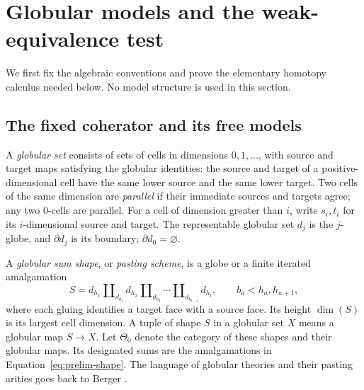 \documentclass[11pt,letterpaper]{article}
\numberwithin{equation}{section}
\theoremstyle{plain}
\theoremstyle{definition}
\theoremstyle{remark}
\begin{document}
\section{Globular models and the weak-equivalence test}
\label{sec:preliminaries}

We first fix the algebraic conventions and prove the elementary homotopy
calculus needed below.  No model structure is used in this section.

\subsection{The fixed coherator and its free models}

A \emph{globular set} consists of sets of cells in dimensions
$0,1,\ldots$, with source and target maps satisfying the globular identities:
the source and target of a positive-dimensional cell have the same lower
source and the same lower target.  Two cells of the same dimension are
\emph{parallel} if their immediate sources and targets agree; any two
$0$-cells are parallel.  For a cell of dimension greater than $i$, write
$s_i,t_i$ for its $i$-dimensional source and target.  The representable
globular set $d_j$ is the $j$-globe, and $\partial d_j$ is its boundary;
$\partial d_0=\varnothing$.

A \emph{globular sum shape}, or \emph{pasting scheme}, is a globe or a
finite iterated amalgamation
\begin{equation}\label{eq:prelim-shape}
 S=d_{h_1}\amalg_{d_{b_1}}d_{h_2}
       \amalg_{d_{b_2}}\cdots\amalg_{d_{b_{l-1}}}d_{h_l},
 \qquad b_a<h_a,h_{a+1},
\end{equation}
where each gluing identifies a target face with a source face.  Its height
$\dim(S)$ is its largest cell dimension.  A tuple of shape $S$ in a
globular set $X$ means a globular map $S\to X$.  Let $\Theta_0$ denote the
category of these shapes and their globular maps.  Its designated sums are
the amalgamations in Equation~\eqref{eq:prelim-shape}.  The language of
globular theories and their pasting arities goes back to
Berger \cite[Definition~1.5]{Berger2002}.
\end{document}
